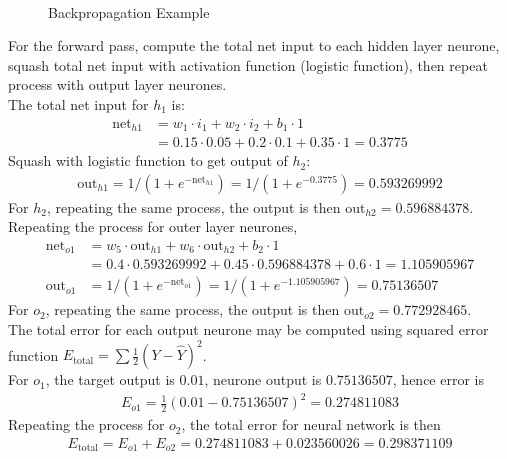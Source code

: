 \begin{example} \\
\begin{figure}[H]
\centering
\scalebox{0.75}{}
\caption{Backpropagation Example}
\end{figure}
For the forward pass, compute the total net input to each hidden layer neurone, squash total net input with activation function (logistic function), then repeat process with output layer neurones.\\
The total net input for $h_1$ is:
\begin{align}
\text{net}_{h1} &= w_1 \cdot i_1 + w_2 \cdot i_2 + b_1 \cdot 1 \nonumber \\
&= 0.15 \cdot 0.05 + 0.2 \cdot 0.1 + 0.35 \cdot 1 = 0.3775 \nonumber
\end{align}
Squash with logistic function to get output of $h_2$:
\begin{align}
\text{out}_{h1} = 1/(1 + e^{-\text{net}_{h1}}) = 1/(1 + e^{-0.3775}) = 0.593269992 \nonumber
\end{align}
For $h_2$, repeating the same process, the output is then $\text{out}_{h2} = 0.596884378$.\\
Repeating the process for outer layer neurones,
\begin{align}
\text{net}_{o1} &= w_5 \cdot \text{out}_{h1} + w_6 \cdot \text{out}_{h2} + b_2 \cdot 1 \nonumber \\
&= 0.4 \cdot 0.593269992 + 0.45 \cdot 0.596884378 + 0.6 \cdot 1 = 1.105905967 \nonumber \\
\text{out}_{o1} &= 1/(1 + e^{-\text{net}_{o1}}) = 1/(1 + e^{-1.105905967}) = 0.75136507 \nonumber
\end{align}
For $o_2$, repeating the same process, the output is then $\text{out}_{o2} = 0.772928465$.\\
The total error for each output neurone may be computed using squared error function $E_{\text{total}} = \sum \frac{1}{2} (Y - \hat{Y})^2$.\\
For $o_1$, the target output is $0.01$, neurone output is $0.75136507$, hence error is
\begin{align}
E_{o1} = \frac{1}{2} (0.01 - 0.75136507)^2 = 0.274811083 \nonumber
\end{align}
Repeating the process for $o_2$, the total error for neural network is then
\begin{align}
E_{\text{total}} = E_{o1} + E_{o2} = 0.274811083 + 0.023560026 = 0.298371109 \nonumber

\end{align}
\end{example}

